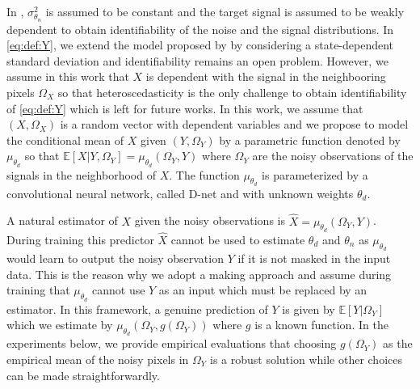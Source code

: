 \documentclass{article}
\begin{document}
In \cite{gassiat:lecorff:lehericy:2021}, $\sigma^2_{\theta_n}$ is assumed to be constant and the target signal is assumed to be weakly dependent to obtain identifiability of the noise and the signal  distributions. %
In \eqref{eq:def:Y}, we extend the model  proposed by \cite{gassiat:lecorff:lehericy:2021} by considering a state-dependent standard deviation and identifiability remains an open problem. However, we assume in this work that $X$ is dependent with the signal in the neighbooring pixels $\Omega_X$ so that heteroscedasticity is the only challenge to obtain identifiability of \eqref{eq:def:Y} which is left for future works.
In this work, we assume that $(X,\Omega_X)$ is a random vector with dependent variables and we propose to model the conditional mean of $X$ given $(Y,\Omega_Y)$ by a parametric function denoted by $\mu_{\theta_d}$ so that $\mathbb{E}[X|Y,\Omega_Y] = \mu_{\theta_d}(\Omega_Y,Y)$ where $\Omega_Y$ are the noisy observations of the signals in the neighborhood of $X$. The function $ \mu_{\theta_d}$ is parameterized by a convolutional neural network, called D-net and with unknown weights $\theta_d$.

A natural estimator of $X$ given the noisy observations is $\widehat X = \mu_{\theta_d}(\Omega_Y,Y)$.
During training this predictor $\widehat X$ cannot be used to estimate $\theta_d$ and $\theta_n$ as $\mu_{\theta_d}$ would learn to output the noisy observation $Y$ if it is not masked in the input data.
This is the reason why we adopt a making approach and assume during training that $\mu_{\theta_d}$ cannot use $Y$ as an input which must be replaced by an estimator.
In this framework, a genuine prediction of $Y$ is given by $\mathbb{E}[Y|\Omega_Y]$ which we estimate by $\mu_{\theta_d}(\Omega_Y,g(\Omega_Y))$ where $g$ is a known function. %
In the experiments below, we provide empirical evaluations that choosing $g(\Omega_Y)$ as the empirical mean of the noisy pixels in $\Omega_Y$ is a robust solution while other choices can be made straightforwardly.
\end{document}
